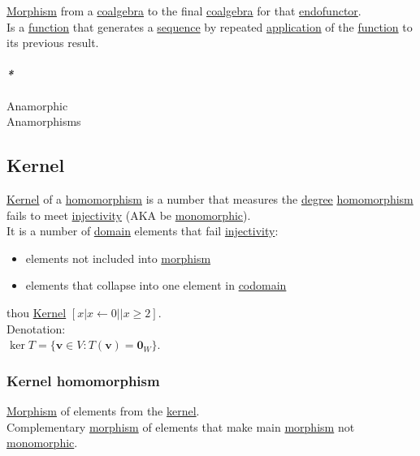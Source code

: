 \documentclass[a4paper,14pt,oneside]{book}
\begin{document}
{\hyperref[orgc09f1a4]{Morphism} from a \hyperref[orgab83bf8]{coalgebra} to the final \hyperref[orgab83bf8]{coalgebra} for that \hyperref[org4c57b82]{endofunctor}.\\

Is a \hyperref[org6a60524]{function} that generates a \hyperref[org3e94228]{sequence} by repeated \hyperref[org623a42d]{application} of the \hyperref[org6a60524]{function} to its previous result.\\

\paragraph{\emph{*}}
\label{sec:org0ae1a32}

\label{org34e8077}Anamorphic\\
\label{org46c4e7b}Anamorphisms\\

\subsection{\label{org5268ed1}Kernel}
\label{sec:org7b1557c}
\hyperref[org5268ed1]{Kernel} of a \hyperref[org203620e]{homomorphism} is a number that measures the \hyperref[orgc130df6]{degree} \hyperref[org203620e]{homomorphism} fails to meet \hyperref[org708ed9c]{injectivity} (AKA be \hyperref[orgce17a43]{monomorphic}).\\
It is a number of \hyperref[org17b9ae1]{domain} elements that fail \hyperref[org708ed9c]{injectivity}:\\
\begin{itemize}
\item elements not included into \hyperref[orgc09f1a4]{morphism}\\
\item elements that collapse into one element in \hyperref[org746d351]{codomain}\\
\end{itemize}
thou \hyperref[org5268ed1]{Kernel} \([ x | x \leftarrow 0 || x \ge 2 ]\).\\

Denotation:\\
\(\operatorname{ker}T = \{ \mathbf{v} \in V:T(\mathbf{v}) = \mathbf{0}_{W} \}\).\\

\subsubsection{\label{orgc592fb9}Kernel homomorphism}
\label{sec:orgb60c8e3}
\hyperref[orgc09f1a4]{Morphism} of elements from the \hyperref[org5268ed1]{kernel}.\\
Complementary \hyperref[orgc09f1a4]{morphism} of elements that make main \hyperref[orgc09f1a4]{morphism} not \hyperref[orgce17a43]{monomorphic}.\\

}
\end{document}
